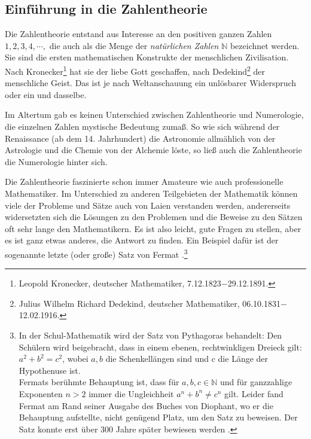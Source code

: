 \begin{refsegment}
\section[Einführung in die Zahlentheorie]{Einführung in die Zahlentheorie\footnotemark}

Die Zahlentheorie entstand aus Interesse an den positiven ganzen Zahlen $1,
2, 3, 4, \cdots ,$ die auch als die Menge der 
{\em natürlichen Zahlen} $\mathbb{N}$ bezeichnet
werden. Sie sind die ersten mathematischen Konstrukte der menschlichen
Zivilisation. Nach Kronecker\footnote{%
Leopold Kronecker, deutscher Mathematiker, 7.12.1823$-$29.12.1891.
}
 hat sie der liebe Gott geschaffen,
nach Dedekind\footnote{Julius Wilhelm Richard Dedekind,
deutscher Mathematiker, 06.10.1831$-$12.02.1916.
}
 der menschliche Geist.
Das ist je nach Weltanschauung ein unlösbarer Widerspruch oder
ein und dasselbe.

Im Altertum gab es keinen Unterschied zwischen Zahlentheorie und
Numerologie, die einzelnen Zahlen mystische Bedeutung zumaß. So wie sich
während der Renaissance (ab dem 14. Jahrhundert) die Astronomie allmählich
von der Astrologie und die Chemie von der Alchemie löste, so ließ auch die
Zahlentheorie die Numerologie hinter sich.

Die Zahlentheorie faszinierte schon immer Amateure wie auch professionelle
Mathematiker. Im Unterschied zu anderen Teilgebieten der Mathematik können
viele der Probleme und Sätze auch von Laien verstanden werden, andererseits
widersetzten sich die Lösungen zu den Problemen und die Beweise zu den Sätzen
oft sehr lange den Mathematikern. Es ist also leicht, gute Fragen zu stellen,
aber es ist ganz etwas anderes, die Antwort zu finden. Ein Beispiel dafür ist
der sogenannte letzte (oder große) Satz von Fermat%
.\footnote{%
   In der Schul-Mathematik wird der Satz von Pythagoras
   behandelt: Den Schülern wird beigebracht, dass in einem ebenen, rechtwinkligen
   Dreieck gilt: $a^2 + b^2 = c^2$, wobei $a, b$ die Schenkellängen sind und
   c die Länge der Hypothenuse ist.\\
   Fermats berühmte Behauptung ist, dass für $a,b,c \in \mathbb{N}$ und
   für ganzzahlige Exponenten $n > 2$ immer die Ungleichheit
   $a^n + b^n \not= c^n$ gilt.
   Leider fand Fermat am Rand seiner Ausgabe des Buches von Diophant, wo er die
   Behauptung aufstellte, nicht genügend Platz, um den Satz zu beweisen.
   Der Satz konnte erst über 300 Jahre später bewiesen
   werden \cite[S. 433-551]{Wiles1994}.
}


\end{refsegment}
